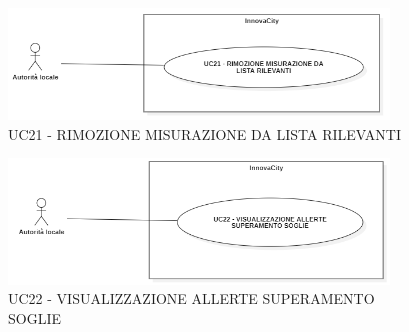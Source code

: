 










\newpage

\begin{figure}[H]
    \centering
    \includegraphics[width=0.9\textwidth]{../Images/uc21.PNG}
    \caption{UC21 - RIMOZIONE MISURAZIONE DA LISTA RILEVANTI }
\end{figure}



\begin{figure}[H]
    \centering
    \includegraphics[width=0.9\textwidth]{../Images/uc22.PNG}
    \caption{UC22 - VISUALIZZAZIONE ALLERTE SUPERAMENTO SOGLIE }
\end{figure}



